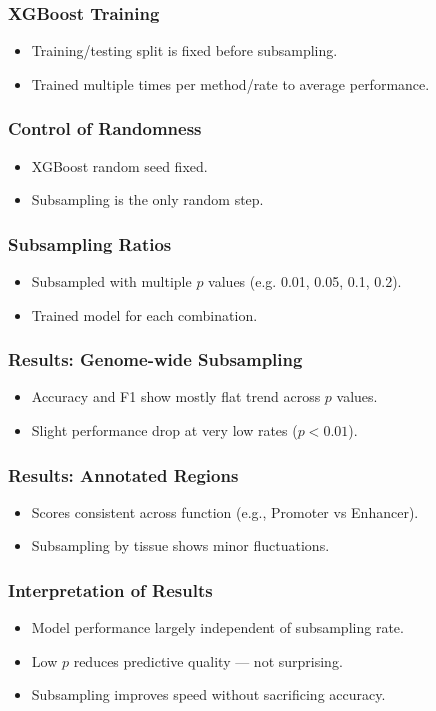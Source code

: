 \documentclass[aspectratio=169]{beamer}
\begin{document}
\begin{frame}
\frametitle{XGBoost Training}
\begin{itemize}
  \item Training/testing split is fixed before subsampling.
  \item Trained multiple times per method/rate to average performance.
\end{itemize}
\end{frame}

\begin{frame}
\frametitle{Control of Randomness}
\begin{itemize}
  \item XGBoost random seed fixed.
  \item Subsampling is the only random step.
\end{itemize}
\end{frame}

\begin{frame}
\frametitle{Subsampling Ratios}
\begin{itemize}
  \item Subsampled with multiple $p$ values (e.g. 0.01, 0.05, 0.1, 0.2).
  \item Trained model for each combination.
\end{itemize}
\end{frame}

\begin{frame}
\frametitle{Results: Genome-wide Subsampling}
\begin{itemize}
  \item Accuracy and F1 show mostly flat trend across $p$ values.
  \item Slight performance drop at very low rates ($p < 0.01$).
\end{itemize}
\end{frame}

\begin{frame}
\frametitle{Results: Annotated Regions}
\begin{itemize}
  \item Scores consistent across function (e.g., Promoter vs Enhancer).
  \item Subsampling by tissue shows minor fluctuations.
\end{itemize}
\end{frame}

\begin{frame}
\frametitle{Interpretation of Results}
\begin{itemize}
  \item Model performance largely independent of subsampling rate.
  \item Low $p$ reduces predictive quality — not surprising.
  \item Subsampling improves speed without sacrificing accuracy.
\end{itemize}
\end{frame}
\end{document}
